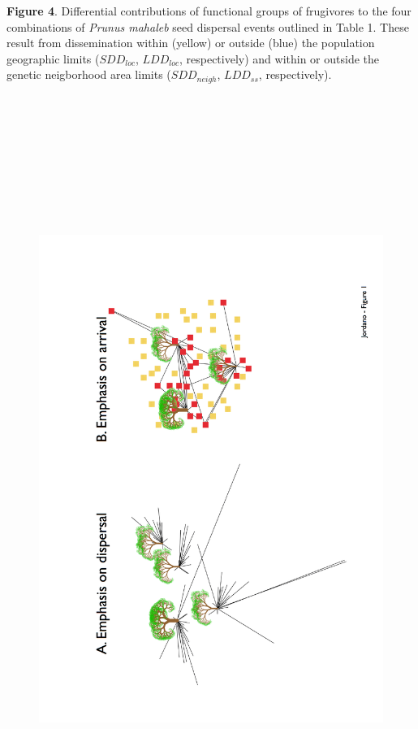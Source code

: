 \documentclass[a4paper, 12pt]{article}
\begin{document}
\begin{linenumbers}
\textbf{Figure 4}. Differential contributions of functional groups of frugivores to the four combinations of \textit{Prunus mahaleb} seed dispersal events outlined in Table 1. These result from dissemination within (yellow) or outside (blue) the population geographic limits ($SDD_{loc}$, $LDD_{loc}$, respectively) and within or outside the genetic neigborhood area limits ($SDD_{neigh}$, $LDD_{ss}$, respectively).\\ 
\newpage

\begin{figure}[htbp]
\centerline{\includegraphics[height=25cm]{Fig1.pdf}}
%
\end{figure}


\end{linenumbers}
\end{document}

